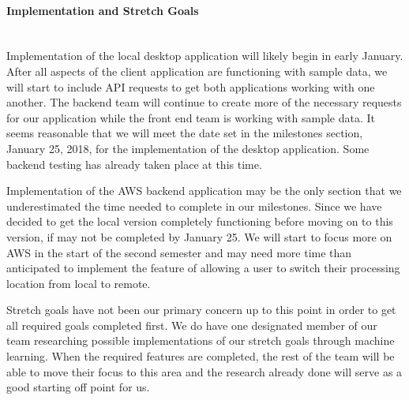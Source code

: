 \paragraph{Implementation and Stretch Goals} \mbox{}\\[\paragraphheaderspace]
Implementation of the local desktop application will likely begin in early January. After all aspects of the client application are functioning with sample data, we will start to include API requests to get both applications working with one another. The backend team will continue to create more of the necessary requests for our application while the front end team is working with sample data. It seems reasonable that we will meet the date set in the milestones section, January 25, 2018, for the implementation of the desktop application. Some backend testing has already taken place at this time.\par
Implementation of the AWS backend application may be the only section that we underestimated the time needed to complete in our milestones. Since we have decided to get the local version completely functioning before moving on to this version, if may not be completed by January 25. We will start to focus more on AWS in the start of the second semester and may need more time than anticipated to implement the feature of allowing a user to switch their processing location from local to remote.\par
Stretch goals have not been our primary concern up to this point in order to get all required goals completed first. We do have one designated member of our team researching possible implementations of our stretch goals through machine learning. When the required features are completed, the rest of the team will be able to move their focus to this area and the research already done will serve as a good starting off point for us.\par 
